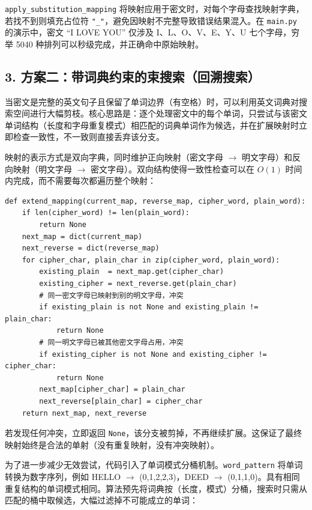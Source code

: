 \documentclass[12pt, a4paper]{article}
\begin{document}
\texttt{apply\_substitution\_mapping} 将映射应用于密文时，对每个字母查找映射字典，若找不到则填充占位符 \texttt{"\_"}，避免因映射不完整导致错误结果混入。在 \texttt{main.py} 的演示中，密文 ``I LOVE YOU'' 仅涉及 I、L、O、V、E、Y、U 七个字母，穷举 5040 种排列可以秒级完成，并正确命中原始映射。

\subsection{3. 方案二：带词典约束的束搜索（回溯搜索）}

当密文是完整的英文句子且保留了单词边界（有空格）时，可以利用英文词典对搜索空间进行大幅剪枝。核心思路是：逐个处理密文中的每个单词，只尝试与该密文单词结构（长度和字母重复模式）相匹配的词典单词作为候选，并在扩展映射时立即检查一致性，不一致则直接丢弃该分支。

映射的表示方式是双向字典，同时维护正向映射（密文字母 $\to$ 明文字母）和反向映射（明文字母 $\to$ 密文字母）。双向结构使得一致性检查可以在 $O(1)$ 时间内完成，而不需要每次都遍历整个映射：

\begin{lstlisting}[style=python, caption={一致性检查的映射扩展函数（substitution\_attack.py）}]
def extend_mapping(current_map, reverse_map, cipher_word, plain_word):
    if len(cipher_word) != len(plain_word):
        return None
    next_map = dict(current_map)
    next_reverse = dict(reverse_map)
    for cipher_char, plain_char in zip(cipher_word, plain_word):
        existing_plain  = next_map.get(cipher_char)
        existing_cipher = next_reverse.get(plain_char)
        # 同一密文字母已映射到别的明文字母，冲突
        if existing_plain is not None and existing_plain != plain_char:
            return None
        # 同一明文字母已被其他密文字母占用，冲突
        if existing_cipher is not None and existing_cipher != cipher_char:
            return None
        next_map[cipher_char] = plain_char
        next_reverse[plain_char] = cipher_char
    return next_map, next_reverse
\end{lstlisting}

若发现任何冲突，立即返回 \texttt{None}，该分支被剪掉，不再继续扩展。这保证了最终映射始终是合法的单射（没有重复映射，没有冲突映射）。

为了进一步减少无效尝试，代码引入了单词模式分桶机制。\texttt{word\_pattern} 将单词转换为数字序列，例如 HELLO $\to$ (0,1,2,2,3)，DEED $\to$ (0,1,1,0)。具有相同重复结构的单词模式相同。算法预先将词典按（长度，模式）分桶，搜索时只需从匹配的桶中取候选，大幅过滤掉不可能成立的单词：
\end{document}
